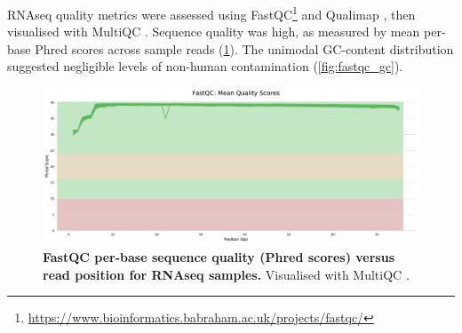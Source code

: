 \gls{RNAseq} quality metrics were assessed using FastQC\footnote{\url{https://www.bioinformatics.babraham.ac.uk/projects/fastqc/}} and Qualimap \autocite{okonechnikov2015QualimapAdvancedMultisample}, then visualised with MultiQC \autocite{ewels2016MultiQCSummarizeAnalysis}.
Sequence quality was high, as measured by mean per-base Phred scores across sample reads (\cref{fig:hird_fastqc_seqQual}).
The unimodal GC-content distribution suggested negligible levels of non-human contamination (\cref{fig:fastqc_gc}).

\begin{figure}
	\centering
	\includegraphics[width=\textwidth]{mainmatter/figures/chapter_02/graphics_firstYearReport/fastqc/mqc_fastqc_per_base_sequence_quality_plot_1.pdf}
    \caption{
        \textbf{FastQC per-base sequence quality (Phred scores) versus read position for \gls{RNAseq} samples.}
        Visualised with MultiQC \autocite{ewels2016MultiQCSummarizeAnalysis}.
    }
	\label{fig:hird_fastqc_seqQual}
\end{figure}


